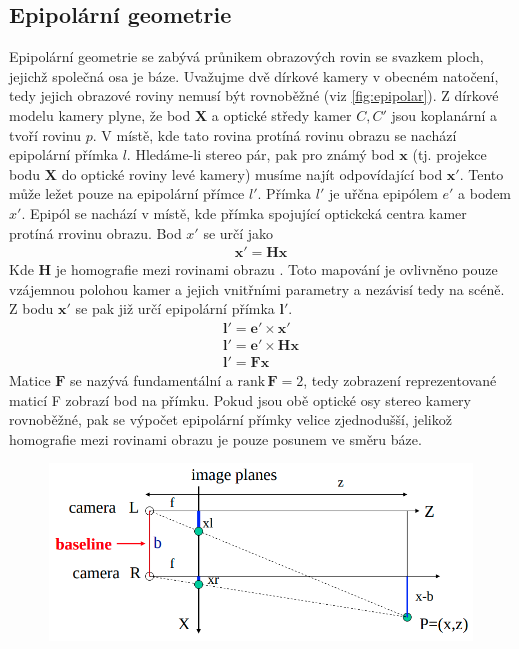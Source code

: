 \documentclass[twoside]{ctuthesis}
\newcommand{\tl}[1]{$\mathbf{#1}$}
\begin{document}
\subsection{Epipolární geometrie}
\label{Sec:epipolar}
Epipolární geometrie se zabývá průnikem obrazových rovin se svazkem ploch, jejichž společná osa je báze. Uvažujme dvě dírkové kamery v obecném natočení, tedy jejich obrazové roviny nemusí být rovnoběžné (viz \ref{fig:epipolar}). Z dírkové modelu kamery plyne, že bod \tl{X} a optické středy kamer $C, C'$ jsou koplanární a tvoří rovinu $p$. V místě, kde tato rovina protíná rovinu obrazu se nachází epipolární přímka $l$. Hledáme-li stereo pár, pak pro známý bod \tl{x} (tj. projekce bodu \tl{X} do optické roviny levé kamery) musíme najít odpovídající bod \tl{x'}. Tento může ležet pouze na epipolární přímce $l'$. Přímka $l'$ je uřčna epipólem $e'$ a bodem $x'$. Epipól se nachází v místě, kde přímka spojující optickcká centra kamer protíná rrovinu obrazu. Bod $x'$ se určí jako 
\begin{align}
    \mathbf{x'} = \mathbf{Hx}
\end{align}
Kde \tl{H} je homografie mezi rovinami obrazu . Toto mapování je ovlivněno pouze vzájemnou polohou kamer a jejich vnitřními parametry a nezávisí tedy na scéně.
Z bodu \tl{x'} se pak již určí epipolární přímka \tl{l'}.
\begin{align}
    \mathbf{l'} = \mathbf{e'} \times \mathbf{x'} \\
    \mathbf{l'} = \mathbf{e'} \times \mathbf{Hx} \\
    \mathbf{l'} = \mathbf{Fx} 
\end{align}    
Matice \tl{F} se nazývá fundamentální a $\text{rank}\,{\mathbf{F}} = 2$, tedy zobrazení reprezentované maticí F zobrazí bod na přímku.
    Pokud jsou obě optické osy stereo kamery rovnoběžné, pak se výpočet epipolární přímky velice zjednodušší, jelikož homografie mezi rovinami obrazu je pouze posunem ve směru báze.
\begin{figure}

    \centering
    \includegraphics[width = 0.8\linewidth]{pictures/stereo_sketch.png}
    \caption{\cite{washingtion_steropic}}
    \label{stereo_paralel}
\end{figure}
\end{document}
